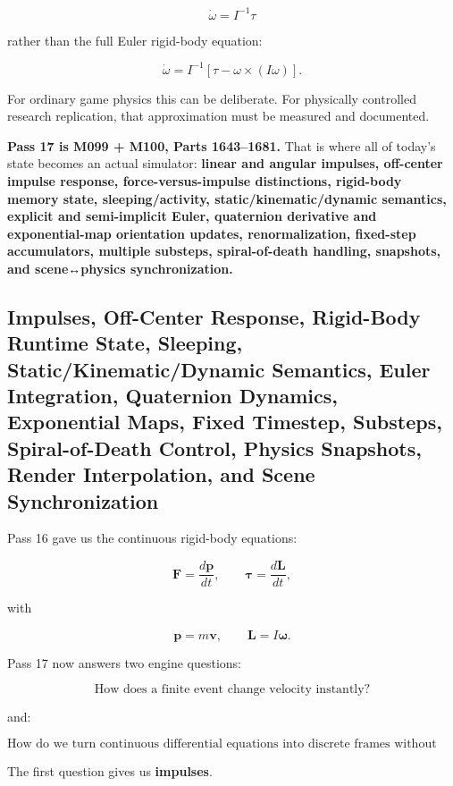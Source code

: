\[
\dot\omega=I^{-1}\tau
\]

rather than the full Euler rigid-body equation:

\[
\boxed{
\dot\omega
=
I^{-1}
[
\tau-\omega\times(I\omega)
].
}
\]

For ordinary game physics this can be deliberate. For physically controlled research replication, that approximation must be measured and documented.

\textbf{Pass 17 is M099 + M100, Parts 1643--1681.} That is where all of today's state becomes an actual simulator: \textbf{linear and angular impulses, off-center impulse response, force-versus-impulse distinctions, rigid-body memory state, sleeping/activity, static/kinematic/dynamic semantics, explicit and semi-implicit Euler, quaternion derivative and exponential-map orientation updates, renormalization, fixed-step accumulators, multiple substeps, spiral-of-death handling, snapshots, and scene↔physics synchronization.}

\subsection{Impulses, Off-Center Response, Rigid-Body Runtime State, Sleeping, Static/Kinematic/Dynamic Semantics, Euler Integration, Quaternion Dynamics, Exponential Maps, Fixed Timestep, Substeps, Spiral-of-Death Control, Physics Snapshots, Render Interpolation, and Scene Synchronization}\label{06-engine-ii-ch036-impulses-off-center-response-rigid-body-runtime-state-sleeping-statickinematicdynamic-semantics-euler-integration-quaternion-dynamics-exponential-maps-fixed-timestep-substeps-spiral-of-death-control-physics-snapshots-render-interpolation-and-scene-synchronization}

Pass 16 gave us the continuous rigid-body equations:

\[
\mathbf F=\frac{d\mathbf p}{dt},
\qquad
\boldsymbol\tau=\frac{d\mathbf L}{dt},
\]

with

\[
\mathbf p=m\mathbf v,
\qquad
\mathbf L=I\boldsymbol\omega.
\]

Pass 17 now answers two engine questions:

\[
\boxed{\text{How does a finite event change velocity instantly?}}
\]

and:

\[
\boxed{\text{How do we turn continuous differential equations into discrete frames without destroying stability?}}
\]

The first question gives us \textbf{impulses}.

